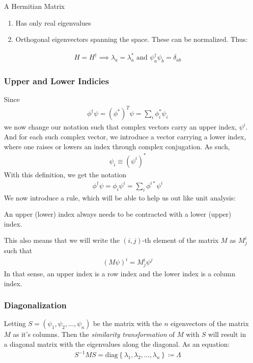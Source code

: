 A Hermitian Matrix \begin{enumerate}
    \item Has only real eigenvalues
    \item Orthogonal eigenvectors spanning the space. These can be normalized. Thus:
\end{enumerate}
\begin{align*}
    H = H^{\dagger} \implies \lambda _a = \lambda _a ^{\ast} \text{ and } \psi_a ^{\dagger} \psi _b = \delta _{ab}
\end{align*}


\subsubsection{Upper and Lower Indicies}
Since \begin{align*}
    \phi^{\dagger} \psi = \left( \phi ^{\ast}  \right) ^T \psi = \sum_{i} \phi _i ^{\ast} \psi _i 
\end{align*} 
we now change our notation such that complex vectors carry an upper index, \(\psi ^i\). And for each such complex vector, we introduce a vector carrying a lower index, where one raises or lowers an index through complex conjugation. As such, \begin{align*}
    \psi _i \equiv \left( \psi ^i \right) ^{\ast} 
\end{align*} 
With this definition, we get the notation \begin{align*}
    \phi ^{\dagger} \psi = \phi _i \psi ^i = \sum_{i} \phi ^{i \ast} \psi ^i  
\end{align*}
We now introduce a rule, which will be able to help us out like unit analysis: \begin{notation}
    An upper (lower) index always needs to be contracted with a lower (upper) index. 
\end{notation}

This also means that we will write the \((i, j)\)-th element of the matrix \(M\) as \(M^i _j \) such that \begin{align*}
    \left( M \psi  \right) ^i = M^i_j \psi ^j 
\end{align*}  
In that sense, an upper index is a row index and the lower index is a column index.

\subsubsection{Diagonalization}
Letting \(S = \left( \psi _1, \psi _2, \dots , \psi _n \right) \) be the matrix with the \(n\) eigenvectors of the matrix \(M\) as it's columns. Then the \textit{similarity transformation} of \(M\) with \(S\) will result in a diagonal matrix with the eigenvalues along the diagonal. As an equation: \begin{align*}
    S^{-1} M S = \mathrm{diag} \left\{ \lambda _1, \lambda _2, \dots, \lambda _n \right\} \coloneqq  \Lambda 
\end{align*} 

